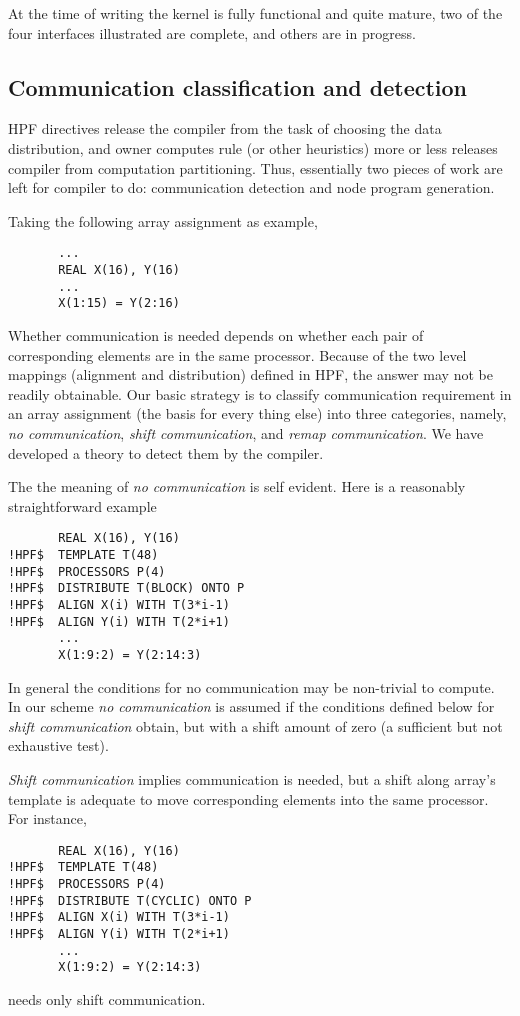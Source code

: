 At the time of writing the kernel is fully functional and quite mature,
two of the four interfaces illustrated are complete, and others are
in progress.


\subsection{Communication classification and detection\label{detection}}

HPF directives release the compiler from the task of choosing the data
distribution, and owner computes rule (or other heuristics) more or
less releases compiler from computation partitioning.  Thus, essentially
two pieces of work are left for compiler to do: communication detection
and node program generation.

Taking the following array assignment as example, 
\small
\begin{verbatim}
       ...
       REAL X(16), Y(16)
       ...
       X(1:15) = Y(2:16)
\end{verbatim}
\normalsize
Whether communication is needed depends on whether each
pair of corresponding elements are in the same processor.
Because of the two level mappings (alignment and distribution)
defined in HPF, the answer may not be readily obtainable.
Our basic strategy is to classify communication requirement
in an array assignment (the basis for every thing else) into
three categories, namely, {\em no communication},
{\em shift communication}, and {\em remap communication}.
We have developed a theory to detect them by the compiler.

The the meaning of {\em no communication} is self evident.
Here is a reasonably straightforward example
\small
\begin{verbatim}
       REAL X(16), Y(16)
!HPF$  TEMPLATE T(48)
!HPF$  PROCESSORS P(4)
!HPF$  DISTRIBUTE T(BLOCK) ONTO P
!HPF$  ALIGN X(i) WITH T(3*i-1)
!HPF$  ALIGN Y(i) WITH T(2*i+1)
       ...
       X(1:9:2) = Y(2:14:3)
\end{verbatim}
\normalsize
In general the conditions for no communication may be non-trivial
to compute.  In our scheme {\em no communication} is assumed if the
conditions defined below for {\em shift communication} obtain, but
with a shift amount of zero (a sufficient but not exhaustive test).

{\em Shift communication} implies communication is needed, but a
shift along array's template is adequate to move corresponding elements
into the same processor. For instance,
\small
\begin{verbatim}
       REAL X(16), Y(16)
!HPF$  TEMPLATE T(48)
!HPF$  PROCESSORS P(4)
!HPF$  DISTRIBUTE T(CYCLIC) ONTO P
!HPF$  ALIGN X(i) WITH T(3*i-1)
!HPF$  ALIGN Y(i) WITH T(2*i+1)
       ...
       X(1:9:2) = Y(2:14:3)
\end{verbatim}
\normalsize
needs only shift communication.

